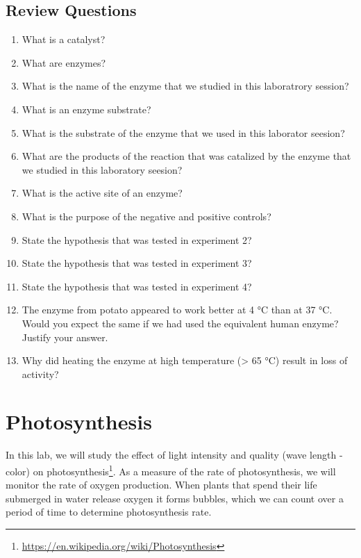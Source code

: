 \documentclass[]{book}
\providecommand{\tightlist}{%
  \setlength{\itemsep}{0pt}\setlength{\parskip}{0pt}}
\let\rmarkdownfootnote\footnote%
\def\footnote{\protect\rmarkdownfootnote}
\renewcommand{\href}[2]{#2\footnote{\url{#1}}}
\theoremstyle{definition}
\theoremstyle{definition}
\theoremstyle{definition}
\theoremstyle{remark}
\begin{document}
\section{Review Questions}\label{review-questions-4}

\begin{enumerate}
\def\labelenumi{\arabic{enumi}.}
\tightlist
\item
  What is a catalyst?
\item
  What are enzymes?
\item
  What is the name of the enzyme that we studied in this laboratrory
  session?
\item
  What is an enzyme substrate?
\item
  What is the substrate of the enzyme that we used in this laborator
  seesion?
\item
  What are the products of the reaction that was catalized by the enzyme
  that we studied in this laboratory seesion?
\item
  What is the active site of an enzyme?
\item
  What is the purpose of the negative and positive controls?
\item
  State the hypothesis that was tested in experiment 2?
\item
  State the hypothesis that was tested in experiment 3?
\item
  State the hypothesis that was tested in experiment 4?
\item
  The enzyme from potato appeared to work better at 4 °C than at 37 °C.
  Would you expect the same if we had used the equivalent human enzyme?
  Justify your answer.
\item
  Why did heating the enzyme at high temperature (\textgreater{} 65 °C)
  result in loss of activity?
\end{enumerate}

\chapter{Photosynthesis}\label{photosynthesis}

In this lab, we will study the effect of light intensity and quality
(wave length - color) on
\href{https://en.wikipedia.org/wiki/Photosynthesis}{photosynthesis}. As
a measure of the rate of photosynthesis, we will monitor the rate of
oxygen production. When plants that spend their life submerged in water
release oxygen it forms bubbles, which we can count over a period of
time to determine photosynthesis rate.
\end{document}
